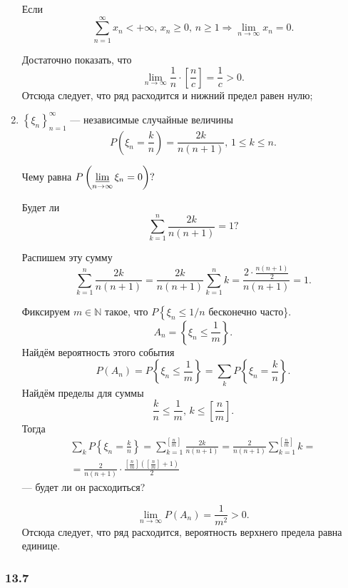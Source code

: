 \begin{enumerate}[label=\alph*)]
Если
$$ \sum \limits_{n=1}^{ \infty} x_n < + \infty, \,
x_n \geq 0, \,
n \geq 1 \Rightarrow
\lim \limits_{n \to \infty } x_n =
0.$$

Достаточно показать, что
$$ \lim \limits_{n \to \infty } \frac{1}{n} \cdot \left[ \frac{n}{c} \right] =
\frac{1}{c} >
0.$$
Отсюда следует, что ряд расходится и нижний предел равен нулю;
\item $ \left\{ \xi_n \right\}_{n=1}^{ \infty }$ --- независимые случайные величины
$$P \left( \xi_n = \frac{k}{n} \right) =
\frac{2k}{n \left( n+1 \right) }, \, 1 \leq k \leq n.$$

Чему равна $P \left( \varliminf \limits_{n \to \infty } \xi_n = 0 \right)?$

Будет ли
$$ \sum \limits_{k=1}^n \frac{2k}{n \left( n+1 \right) } =
1?$$

Распишем эту сумму
$$ \sum \limits_{k=1}^n \frac{2k}{n \left( n+1 \right) } =
\frac{2k}{n \left( n+1 \right) } \sum \limits_{k=1}^n k=
\frac{2 \cdot \frac{n \left( n+1 \right) }{2}}{n \left( n+1 \right) } =
1.$$

Фиксируем $m \in \mathbb{N}$ такое, что $P \left\{ \xi_n \leq 1/n \right.$ бесконечно часто\}.
$$A_n =
\left\{ \xi_n \leq \frac{1}{m} \right\}.$$
Найдём вероятность этого события
$$P \left( A_n \right) =
P \left\{ \xi_n \leq \frac{1}{m} \right\} =
\sum \limits_{k} P \left\{ \xi_n = \frac{k}{n} \right\}.$$
Найдём пределы для суммы
$$ \frac{k}{n} \leq \frac{1}{m}, \, k \leq \left[ \frac{n}{m} \right].$$
Тогда
\begin{equation*}
\begin{split}
\sum \limits_{k} P \left\{ \xi_n = \frac{k}{n} \right\} =
\sum \limits_{k=1}^{ \left[ \frac{n}{m} \right] } \frac{2k}{n \left( n+1 \right) } =
\frac{2}{n \left( n+1 \right) } \sum \limits_{k=1}^{ \left[ \frac{n}{m} \right] } k = \\
= \frac{2}{n \left( n+1 \right) } \cdot \frac{ \left[ \frac{n}{m} \right] \left( \left[ \frac{n}{m} \right] + 1 \right) }{2}
\end{split}
\end{equation*}
--- будет ли он расходиться?

$$ \lim \limits_{n \to \infty } P \left( A_n \right) =
\frac{1}{m^2} >
0.$$
Отсюда следует, что ряд расходится, вероятность верхнего предела равна единице.
\end{enumerate}

\subsubsection*{13.7}

